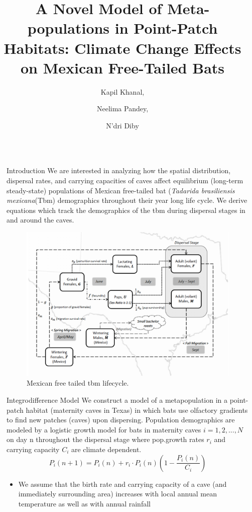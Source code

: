 \documentclass[final]{beamer}
\title{A Novel Model of Meta-populations in Point-Patch Habitats: Climate Change Effects on Mexican Free-Tailed Bats}
\author{Kapil Khanal,  \and Neelima Pandey, \and N'dri Diby }
\institute[shortinst]{Winona State University }
\newlength{\sepwidth}
\newlength{\colwidth}
\newcommand{\separatorcolumn}{\begin{column}{\sepwidth}\end{column}}
\begin{document}
\begin{frame}[t]
\begin{columns}[t]
\separatorcolumn

\begin{column}{\colwidth}

  \begin{block}{Introduction}
We are interested in analyzing how the spatial distribution, dispersal rates, and carrying capacities of caves affect equilibrium (long-term steady-state) populations of Mexican free-tailed bat (\textit {Tadarida brasiliensis mexicana}(Tbm) demographics throughout their year long life cycle. We derive equations which track the demographics of the tbm during dispersal stages in and around the caves.
\begin{figure}
      \centering
      \includegraphics[width = 12cm,length = 14cm]{life-cycle}
      \caption{Mexican free tailed tbm lifecycle.}
      \end{figure}
  \end{block}
  \begin{block}{Integrodifference Model}
 We construct a model of a metapopulation in a point-patch habitat (maternity caves in Texas) in which bats use olfactory gradients to find new patches (caves) upon dispersing. Population demographics are modeled by a logistic growth model for bats in maternity caves $i=1, 2, ..., N$ on day n throughout the dispersal stage where pop.growth rates $r_i$ and carrying capacity $C_i$ are climate dependent.
\begin{equation}
    P_i(n + 1) = P_i(n) + r_i \cdot P_i(n)\left(1-\frac{P_i(n)}{C_i}\right) 
\end{equation}
    \begin{itemize}
      \item  We assume that the birth rate and carrying capacity of a cave (and immediately surrounding area) increases with local annual mean temperature as well as with annual rainfall

\end{itemize}
\end{block}
\end{column}
\end{columns}
\end{frame}
\end{document}
